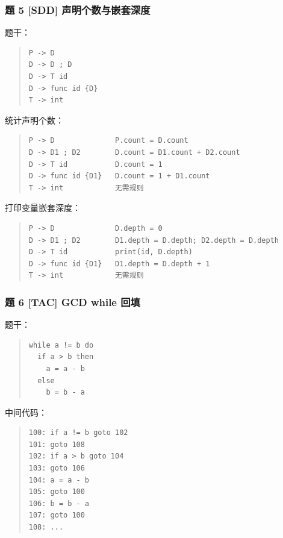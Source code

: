 \documentclass[UTF8,zihao=-4]{ctexart}
\begin{document}
\subsubsection{题 5 [SDD] 声明个数与嵌套深度}


题干：


\begin{quote}
\footnotesize
\begin{verbatim}
P -> D
D -> D ; D
D -> T id
D -> func id {D}
T -> int
\end{verbatim}
\end{quote}


统计声明个数：


\begin{quote}
\footnotesize
\begin{verbatim}
P -> D              P.count = D.count
D -> D1 ; D2        D.count = D1.count + D2.count
D -> T id           D.count = 1
D -> func id {D1}   D.count = 1 + D1.count
T -> int            无需规则
\end{verbatim}
\end{quote}


打印变量嵌套深度：


\begin{quote}
\footnotesize
\begin{verbatim}
P -> D              D.depth = 0
D -> D1 ; D2        D1.depth = D.depth; D2.depth = D.depth
D -> T id           print(id, D.depth)
D -> func id {D1}   D1.depth = D.depth + 1
T -> int            无需规则
\end{verbatim}
\end{quote}


\subsubsection{题 6 [TAC] GCD while 回填}


题干：


\begin{quote}
\footnotesize
\begin{verbatim}
while a != b do
  if a > b then
    a = a - b
  else
    b = b - a
\end{verbatim}
\end{quote}


中间代码：


\begin{quote}
\footnotesize
\begin{verbatim}
100: if a != b goto 102
101: goto 108
102: if a > b goto 104
103: goto 106
104: a = a - b
105: goto 100
106: b = b - a
107: goto 100
108: ...
\end{verbatim}
\end{quote}
\end{document}
